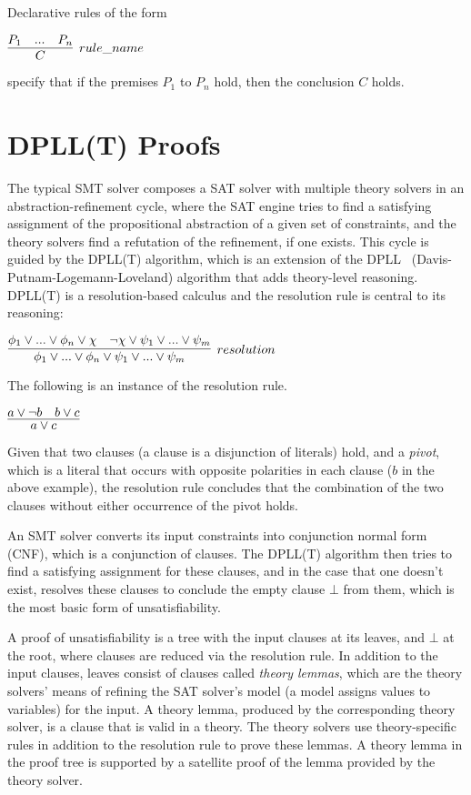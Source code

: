 \documentclass{article}
\begin{document}
	Declarative rules of the form
	\begin{center}
		$\infer[rule\_name]{C}{P_1 & ... & P_n}$
	\end{center}
	specify that if the premises $P_1$ to 
	$P_n$ hold, then the conclusion $C$
	holds.
	
	

\section{DPLL(T) Proofs}
\label{sec:smtproofs}
	The typical SMT solver composes 
	a SAT solver with multiple theory
	solvers in an abstraction-refinement
	cycle, where the SAT engine 
	tries to find a satisfying 
	assignment of the propositional
	abstraction of a given set of 
	constraints, and the theory
	solvers find a refutation of 
	the refinement, if one exists.
	This cycle is guided by the 
	DPLL(T) algorithm, which is an
	extension of the 
	DPLL~\cite{Loveland2016}
	(Davis-Putnam-Logemann-Loveland) 
	algorithm that adds theory-level 
	reasoning. DPLL(T) is a 
	resolution-based calculus and the 
	resolution rule is central to its 
	reasoning:
	\begin{center}
		$\infer[resolution]{\phi_1 \lor ... \lor 
			\phi_n \lor \psi_1 \lor ... \lor 
			\psi_m}{\phi_1 \lor ... \lor \phi_n 
			\lor \chi & \neg \chi \lor \psi_1 
			\lor ... \lor \psi_m}$ 
	\end{center}
	The following is an instance of the 
	resolution rule.
	\begin{center}
		$\infer{a \lor c}{a \lor \neg b 
			& b \lor c}$
	\end{center}
	Given that two clauses (a clause 
	is a disjunction of literals) hold, 
	and a \textit{pivot}, which is a 
	literal that occurs with opposite 
	polarities in each clause ($b$ in 
	the above example), the resolution 
	rule concludes that 
	the combination of the two clauses 
	without either occurrence of the 
	pivot holds.
	
	An SMT solver converts its input 
	constraints into conjunction 
	normal form (CNF), which is a 
	conjunction of clauses. The 
	DPLL(T) algorithm then tries 
	to find a satisfying assignment 
	for these clauses, and in the 
	case that one doesn't exist,
	resolves these clauses to 
	conclude the empty clause 
	$\bot$ from them, which is the 
	most basic form of unsatisfiability.
	
	A proof of unsatisfiability is 
	a tree with the input clauses at 
	its leaves, and $\bot$ at the 
	root, where clauses are reduced
	via the resolution rule. In 
	addition to the input clauses, 
	leaves consist of clauses 
	called \textit{theory lemmas}, 
	which are the theory solvers' 
	means of refining the SAT solver's
	model (a model assigns values 
	to variables) for the input. A
	theory lemma, produced by the 
	corresponding theory
	solver, is a clause that is
	valid in a theory. The theory 
	solvers use theory-specific 
	rules in addition to the 
	resolution rule to prove these 
	lemmas. A theory lemma in the 
	proof tree is supported by a 
	satellite proof of the lemma
	provided by the theory solver. 
	
\end{document}

